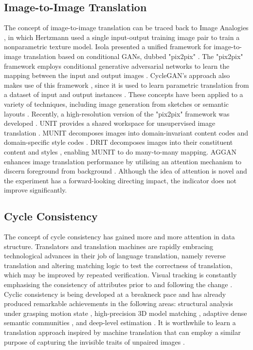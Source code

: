 \documentclass{article}
\begin{document}
\subsection{Image-to-Image Translation}
The concept of image-to-image translation can be traced back to Image Analogies \cite{Image_Analogies}, in which Hertzmann used a single input-output training image pair to train a nonparametric texture model. Isola presented a unified framework for image-to-image translation based on conditional GANs, dubbed "pix2pix" \cite{Conditional}. The "pix2pix" framework employs conditional generative adversarial networks to learn the mapping between the input and output images \cite{AL}. CycleGAN's approach also makes use of this framework \cite{Cycle}, since it is used to learn parametric translation from a dataset of input and output instances \cite{CNN}. These concepts have been applied to a variety of techniques, including image generation from sketches \cite{Scribbler} or semantic layouts \cite{Semantic_Layouts}. Recently, a high-resolution version of the "pix2pix" framework was developed \cite{Conditional_GANs}. UNIT provides a shared workspace for unsupervised image translation \cite{UNIT}. MUNIT decomposes images into domain-invariant content codes and domain-specific style codes \cite{image_translation_2}. DRIT decomposes images into their constituent content and styles \cite{DIRT}, enabling MUNIT to do many-to-many mapping. AGGAN enhances image translation performance by utilising an attention mechanism to discern foreground from background \cite{AGGAN}. Although the idea of attention is novel and the experiment has a forward-looking directing impact, the indicator does not improve significantly.

\subsection{Cycle Consistency}
The concept of cycle consistency has gained more and more attention in data structure. Translators \cite{translators} and translation machines \cite{translation_machines} are rapidly embracing technological advances in their job of language translation, namely reverse translation and altering matching logic to test the correctness of translation, which may be improved by repeated verification. Visual tracking is constantly emphasising the consistency of attributes prior to and following the change \cite{visual_tracking}. Cyclic consistency is being developed at a breakneck pace and has already produced remarkable achievements in the following areas: structural analysis under grasping motion state \cite{motion_state}, high-precision 3D model matching \cite{3D_Model}, adaptive dense semantic communities \cite{dense_semantic}, and deep-level estimation \cite{deep-level}. It is worthwhile to learn a translation approach inspired by machine translation that can employ a similar purpose of capturing the invisible traits of unpaired images \cite{DualGAN}.
\end{document}
